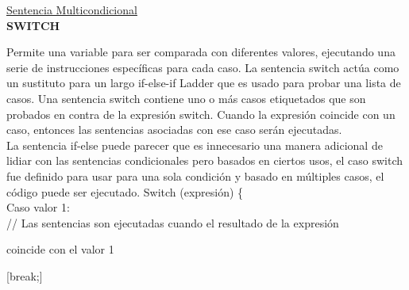 \documentclass[11pt, letterpaper, spanish]{article}
\begin{document}
{{\underline{Sentencia Multicondicional}\\
\textbf{SWITCH}
\par{Permite una variable para ser comparada con diferentes valores, ejecutando una serie de instrucciones específicas para cada caso. La sentencia switch actúa como un sustituto para un largo if-else-if  Ladder que es usado para probar una lista de casos. Una sentencia switch contiene uno o más casos etiquetados que son probados en contra de la expresión switch. Cuando la expresión coincide con un caso, entonces las sentencias asociadas con ese caso serán ejecutadas.}
\\
La sentencia if-else puede parecer que es innecesario una manera adicional de lidiar con las sentencias condicionales pero basados en ciertos usos, el caso switch fue definido para usar para una sola condición y basado en múltiples casos, el código puede ser ejecutado.
\vspace{0.5 cm}
Switch (expresión) \{ \\
   Caso valor 1: \\
     // Las sentencias son ejecutadas cuando el resultado de la expresión 
     
     coincide con el valor 1
     
     [break;] 
     
     \vspace{0.5 cm}
     
}}
\end{document}
